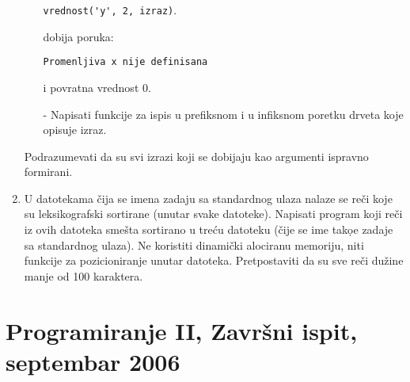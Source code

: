 \begin{enumerate}
\begin{itemize}
\verb|vrednost('y', 2, izraz)|.

dobija poruka:

\verb|Promenljiva x nije definisana|

i povratna vrednost 0.

\item[-]
Napisati funkcije za ispis u prefiksnom i u infiksnom poretku
drveta koje opisuje izraz.
\end{itemize}

Podrazumevati da su svi izrazi koji se dobijaju kao argumenti
ispravno formirani.

\item
U datotekama \v cija se imena zadaju sa standardnog ulaza nalaze se re\v ci
koje su leksikografski sortirane (unutar svake datoteke). Napisati program koji
re\v ci iz ovih datoteka sme\v sta sortirano u tre\'cu datoteku (\v{c}ije se
ime tako{\d}e zadaje sa standardnog ulaza). Ne koristiti dinami\v{c}ki
alociranu memoriju, niti funkcije za pozicioniranje unutar datoteka.
Pretpostaviti da su sve re\v{c}i du\v{z}ine manje od 100 karaktera.

\end{enumerate}



\section{Programiranje II, Zavr\v{s}ni ispit, septembar 2006}



